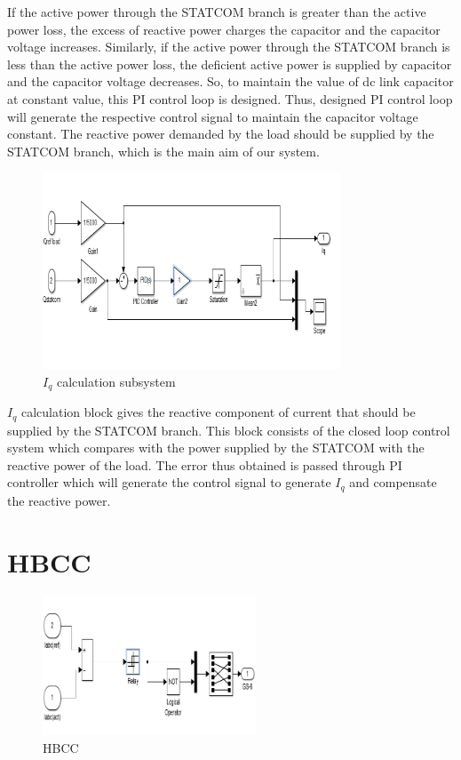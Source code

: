 \documentclass[journal,twoside]{IEEEtran}
\begin{document}
If the active power through the
STATCOM branch is greater than the active
power loss, the excess of reactive power charges
the capacitor and the capacitor voltage
increases. Similarly, if the active power through
the STATCOM branch is less than the active
power loss, the deficient active power is supplied
by capacitor and the capacitor voltage
decreases. So, to maintain the value of dc link capacitor at constant value, this PI control loop
is designed. Thus, designed PI control loop will
generate the respective control signal to
maintain the capacitor voltage constant.
The reactive power demanded by the load
should be supplied by the STATCOM branch,
which is the main aim of our system.

\begin{figure}[!ht]
\includegraphics[width=3.5in]{5}
\caption{$I_q$ calculation subsystem}
\label{f5}
\end{figure}
 $I_q$ calculation block gives the reactive component
of current that should be supplied by the
STATCOM branch. This block consists of the
closed loop control system which compares with
the power supplied by the STATCOM with the
reactive power of the load. The error thus
obtained is passed through PI controller which
will generate the control signal to generate $I_q$
and compensate the reactive power.

\section{HBCC}

\begin{figure}[!ht]
\includegraphics[width=2.5in]{6}
\caption{HBCC}
\label{f6}
\end{figure}
\end{document}
